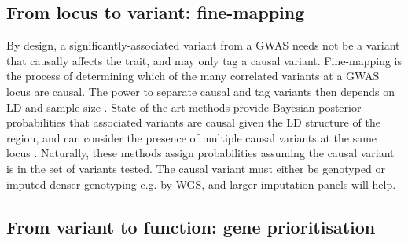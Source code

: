 \begin{outline}

\subsection{From locus to variant: fine-mapping}

\1 By design, a significantly-associated variant from a \gls{GWAS} needs not be a variant that causally affects the trait, and may only tag a causal variant.
    \2 Fine-mapping is the process of determining which of the many correlated variants at a \gls{GWAS} locus are causal.
    \2 The power to separate causal and tag variants then depends on \gls{LD} and sample size \autocite{visscher201710YearsGWAS}.
    \2 State-of-the-art methods provide Bayesian posterior probabilities that associated variants are causal given the \gls{LD} structure of the region, and can consider the presence of multiple causal variants at the same locus \autocite{schaid2018GenomewideAssociationsCandidate}.
    \2 Naturally, these methods assign probabilities assuming the causal variant is in the set of variants tested.
    \2 The causal variant must either be genotyped or imputed denser genotyping e.g. by WGS, and larger imputation panels will help.

\subsection{From variant to function: gene prioritisation}


\end{outline}
